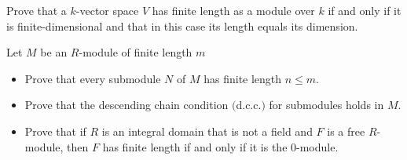 \begin{exercise}
Prove that a $k$-vector space $V$ has finite length as a module over $k$ if and only if it is finite-dimensional and that in this case its length equals its dimension.
\end{exercise}
\begin{exercise}
Let $M$ be an $R$-module of finite length $m$
\begin{itemize}
\item Prove that every submodule $N$ of $M$ has finite length $n\leqslant m$.
\item Prove that the descending chain condition $($d.c.c.$)$ for submodules holds in $M$.
\item Prove that if $R$ is an integral domain that is not a field and $F$ is a free $R$-module, then $F$ has finite length if and only if it is the $0$-module.
\end{itemize}
\end{exercise}
